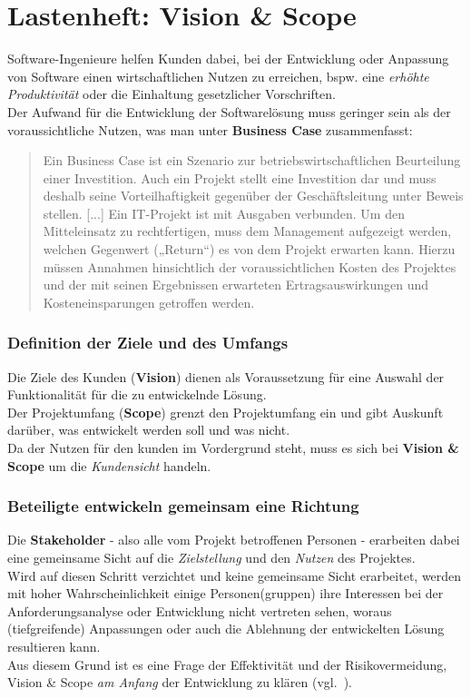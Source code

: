 \section{Lastenheft: Vision \& Scope}

Software-Ingenieure helfen Kunden dabei, bei der Entwicklung oder Anpassung von Software einen wirtschaftlichen Nutzen zu erreichen, bspw. eine \textit{erhöhte Produktivität} oder die Einhaltung gesetzlicher Vorschriften.\\
Der Aufwand für die Entwicklung der Softwarelösung muss geringer sein als der voraussichtliche Nutzen, was man unter \textbf{Business Case} zusammenfasst:

\blockquote[{\cite[11]{Brug09}}]{
    Ein Business Case ist ein Szenario zur betriebswirtschaftlichen Beurteilung einer Investition.
    Auch ein Projekt stellt eine Investition dar und
    muss deshalb seine Vorteilhaftigkeit gegenüber der Geschäftsleitung unter
    Beweis stellen. [...] Ein IT-Projekt ist mit Ausgaben verbunden. Um den Mitteleinsatz zu rechtfertigen, muss dem Management
    aufgezeigt werden, welchen Gegenwert („Return“) es von dem Projekt erwarten kann. Hierzu müssen Annahmen hinsichtlich der voraussichtlichen
    Kosten des Projektes und der mit seinen Ergebnissen erwarteten Ertragsauswirkungen und Kosteneinsparungen getroffen werden.
}

\subsubsection*{Definition der Ziele und des Umfangs}
Die Ziele des Kunden (\textbf{Vision}) dienen als Voraussetzung für eine Auswahl der Funktionalität für die zu entwickelnde Lösung.\\
Der Projektumfang (\textbf{Scope}) grenzt den Projektumfang ein und gibt Auskunft darüber, was entwickelt werden soll und was nicht.\\
Da der Nutzen für den kunden im Vordergrund steht, muss es sich bei \textbf{Vision \& Scope} um die \textit{Kundensicht} handeln.\\

\subsubsection*{Beteiligte entwickeln gemeinsam eine Richtung}
Die \textbf{Stakeholder} - also alle vom Projekt betroffenen Personen - erarbeiten dabei eine gemeinsame Sicht auf die \textit{Zielstellung} und den \textit{Nutzen} des Projektes.\\
Wird auf diesen Schritt verzichtet und keine gemeinsame Sicht erarbeitet, werden mit hoher Wahrscheinlichkeit einige Personen(gruppen) ihre Interessen bei der Anforderungsanalyse oder  Entwicklung nicht vertreten sehen, woraus (tiefgreifende) Anpassungen oder auch die Ablehnung der entwickelten Lösung resultieren kann.\\
Aus diesem Grund ist es eine Frage der Effektivität und der Risikovermeidung, Vision \& Scope \textit{am Anfang} der Entwicklung zu klären (vgl.~\cite[44]{Wed09}).

